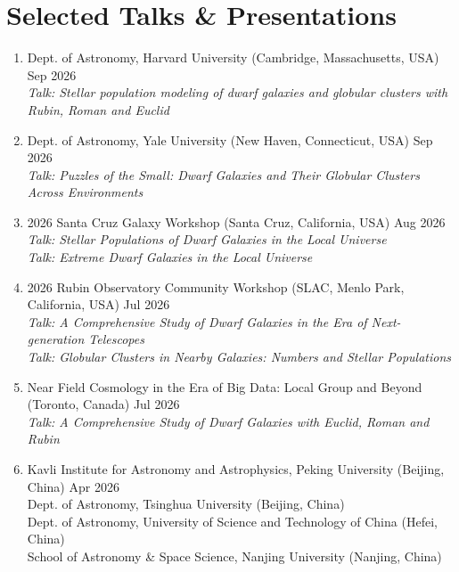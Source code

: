 \documentclass[letterpaper,11pt]{article}
\begin{document}
\section{Selected Talks \& Presentations}
\begin{enumerate}[itemsep=0pt]
  \item[-] Dept. of Astronomy, Harvard University {\small (Cambridge, Massachusetts, USA)} \hfill {Sep 2026}\\
  {\em Talk: Stellar population modeling of dwarf galaxies and globular clusters with Rubin, Roman and Euclid}
  \item[-] Dept. of Astronomy, Yale University {\small (New Haven, Connecticut, USA)} \hfill {Sep 2026}\\
  {\em Talk: Puzzles of the Small: Dwarf Galaxies and Their Globular Clusters Across Environments}
  \item[-] 2026 Santa Cruz Galaxy Workshop {\small (Santa Cruz, California, USA)} \hfill {Aug 2026}\\
  {\em Talk: Stellar Populations of Dwarf Galaxies in the Local Universe}\\
  {\em Talk: Extreme Dwarf Galaxies in the Local Universe}\\
  \item[-] 2026 Rubin Observatory Community Workshop {\small (SLAC, Menlo Park, California, USA)} \hfill {Jul 2026}\\
  {\em Talk: A Comprehensive Study of Dwarf Galaxies in the Era of Next-generation Telescopes}\\
  {\em Talk: Globular Clusters in Nearby Galaxies: Numbers and Stellar Populations}\\
  \item[-] Near Field Cosmology in the Era of Big Data: Local Group and Beyond {\small (Toronto, Canada)} \hfill {Jul 2026}\\
  {\em Talk: A Comprehensive Study of Dwarf Galaxies with Euclid, Roman and Rubin}\\
  \item[-] Kavli Institute for Astronomy and Astrophysics, Peking University {\small (Beijing, China)} \hfill {Apr 2026}\\
  Dept. of Astronomy, Tsinghua University {\small (Beijing, China)}\\
  Dept. of Astronomy, University of Science and Technology of China {\small (Hefei, China)}\\
  School of Astronomy \& Space Science, Nanjing University {\small (Nanjing, China)}\\

\end{enumerate}
\end{document}
